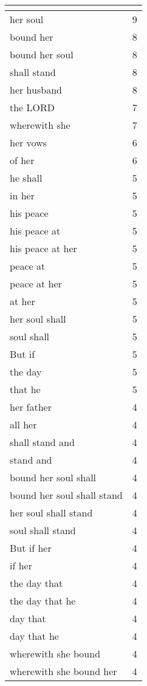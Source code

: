 \begin{center}
\begin{longtable}{|p{3.0in}|p{0.5in}|}
\hline \multicolumn{2}{c}{{ }} \\ \hline
\endfoot 
her soul & 9\\ \hline 
bound her & 8\\ \hline 
bound her soul & 8\\ \hline 
shall stand & 8\\ \hline 
her husband & 8\\ \hline 
the LORD & 7\\ \hline 
wherewith she & 7\\ \hline 
her vows & 6\\ \hline 
of her & 6\\ \hline 
he shall & 5\\ \hline 
in her & 5\\ \hline 
his peace & 5\\ \hline 
his peace at & 5\\ \hline 
his peace at her & 5\\ \hline 
peace at & 5\\ \hline 
peace at her & 5\\ \hline 
at her & 5\\ \hline 
her soul shall & 5\\ \hline 
soul shall & 5\\ \hline 
But if & 5\\ \hline 
the day & 5\\ \hline 
that he & 5\\ \hline 
her father & 4\\ \hline 
all her & 4\\ \hline 
shall stand and & 4\\ \hline 
stand and & 4\\ \hline 
bound her soul shall & 4\\ \hline 
bound her soul shall stand & 4\\ \hline 
her soul shall stand & 4\\ \hline 
soul shall stand & 4\\ \hline 
But if her & 4\\ \hline 
if her & 4\\ \hline 
the day that & 4\\ \hline 
the day that he & 4\\ \hline 
day that & 4\\ \hline 
day that he & 4\\ \hline 
wherewith she bound & 4\\ \hline 
wherewith she bound her & 4\\ \hline 

\end{longtable}
\end{center}
